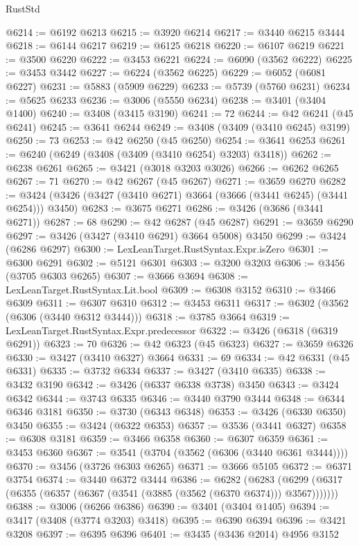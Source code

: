 \begin{lexlean}{RustStd}
\begin{coremodule}
@6214 := @6192 @6213
@6215 := @3920 @6214
@6217 := @3440 @6215 @3444
@6218 := @6144 @6217
@6219 := @6125 @6218
@6220 := @6107 @6219
@6221 := @3500 @6220
@6222 := @3453 @6221
@6224 := @6090 (@3562 @6222)
@6225 := @3453 @3442
@6227 := @6224 (@3562 @6225)
@6229 := @6052 (@6081 @6227)
@6231 := @5883 (@5909 @6229)
@6233 := @5739 (@5760 @6231)
@6234 := @5625 @6233
@6236 := @3006 (@5550 @6234)
@6238 := @3401 (@3404 @1400)
@6240 := @3408 (@3415 @3190)
@6241 := 72
@6244 := @42 @6241 (@45 @6241)
@6245 := @3641 @6244
@6249 := @3408 (@3409 (@3410 @6245) @3199)
@6250 := 73
@6253 := @42 @6250 (@45 @6250)
@6254 := @3641 @6253
@6261 := @6240 (@6249 (@3408 (@3409 (@3410 @6254) @3203) @3418))
@6262 := @6238 @6261
@6265 := @3421 (@3018 @3203 @3026)
@6266 := @6262 @6265
@6267 := 71
@6270 := @42 @6267 (@45 @6267)
@6271 := @3659 @6270
@6282 := @3424 (@3426 (@3427 (@3410 @6271) @3664 (@3666 (@3441 @6245) (@3441 @6254))) @3450)
@6283 := @3675 @6271
@6286 := @3426 (@3686 (@3441 @6271))
@6287 := 68
@6290 := @42 @6287 (@45 @6287)
@6291 := @3659 @6290
@6297 := @3426 (@3427 (@3410 @6291) @3664 @5008) @3450
@6299 := @3424 (@6286 @6297)
@6300 := LexLeanTarget.RustSyntax.Expr.isZero
@6301 := @6300 @6291
@6302 := @5121 @6301
@6303 := @3200 @3203
@6306 := @3456 (@3705 @6303 @6265)
@6307 := @3666 @3694
@6308 := LexLeanTarget.RustSyntax.Lit.bool
@6309 := @6308 @3152
@6310 := @3466 @6309
@6311 := @6307 @6310
@6312 := @3453 @6311
@6317 := @6302 (@3562 (@6306 (@3440 @6312 @3444)))
@6318 := @3785 @3664
@6319 := LexLeanTarget.RustSyntax.Expr.predecessor
@6322 := @3426 (@6318 (@6319 @6291))
@6323 := 70
@6326 := @42 @6323 (@45 @6323)
@6327 := @3659 @6326
@6330 := @3427 (@3410 @6327) @3664
@6331 := 69
@6334 := @42 @6331 (@45 @6331)
@6335 := @3732 @6334
@6337 := @3427 (@3410 @6335)
@6338 := @3432 @3190
@6342 := @3426 (@6337 @6338 @3738) @3450
@6343 := @3424 @6342
@6344 := @3743 @6335
@6346 := @3440 @3790 @3444
@6348 := @6344 @6346 @3181
@6350 := @3730 (@6343 @6348)
@6353 := @3426 (@6330 @6350) @3450
@6355 := @3424 (@6322 @6353)
@6357 := @3536 (@3441 @6327)
@6358 := @6308 @3181
@6359 := @3466 @6358
@6360 := @6307 @6359
@6361 := @3453 @6360
@6367 := @3541 (@3704 (@3562 (@6306 (@3440 @6361 @3444))))
@6370 := @3456 (@3726 @6303 @6265)
@6371 := @3666 @5105
@6372 := @6371 @3754
@6374 := @3440 @6372 @3444
@6386 := @6282
    (@6283 (@6299 (@6317 (@6355 (@6357 (@6367 (@3541 (@3885 (@3562 (@6370 @6374))) @3567)))))))
@6388 := @3006 (@6266 @6386)
@6390 := @3401 (@3404 @1405)
@6394 := @3417 (@3408 (@3774 @3203) @3418)
@6395 := @6390 @6394
@6396 := @3421 @3208
@6397 := @6395 @6396
@6401 := @3435 (@3436 @2014) @4956 @3152

\end{coremodule}
\end{lexlean}
